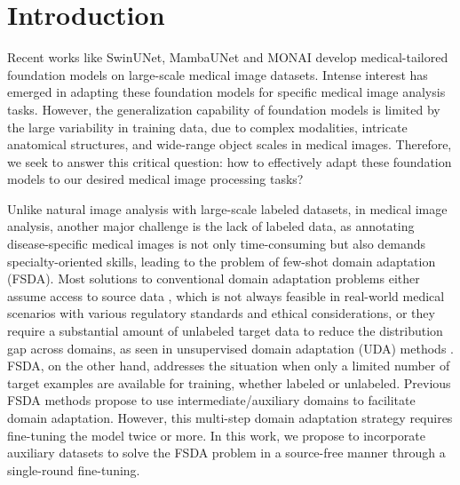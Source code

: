 \vspace{-0.1cm}
\section{Introduction}
\vspace{-0.1cm}
\label{sec:intro}
Recent works like SwinUNet\cite{cao2022swin}, MambaUNet \cite{wang2024mamba} and MONAI \cite{cardoso2022monai} develop medical-tailored foundation models on large-scale medical image datasets. 
Intense interest has emerged in adapting these foundation models for specific medical image analysis tasks. 
However, the generalization capability of foundation models is limited by the large variability in training data, due to complex modalities, intricate anatomical structures, and wide-range object scales in medical images.
Therefore, we seek to answer this critical question: how to effectively adapt these foundation models to our desired medical image processing tasks? 
% 

Unlike natural image analysis with large-scale labeled datasets, in medical image analysis, another major challenge is the lack of labeled data, as 
annotating disease-specific medical images is not only time-consuming but also demands %
specialty-oriented skills, leading to the problem of few-shot domain adaptation (FSDA). 
Most solutions to conventional domain adaptation problems either assume access to source data \cite{bermudez2018domain}, which is not always feasible in real-world medical scenarios with various regulatory standards and ethical considerations,
or they require a substantial amount of unlabeled target data to reduce the distribution gap across domains, as seen in unsupervised domain adaptation (UDA) methods  \cite{wu2021unsupervised}.
FSDA, on the other hand, addresses the situation when only a limited number of target examples are available for training, whether labeled or unlabeled.
Previous FSDA methods \cite{gu2019progressive} propose to use intermediate/auxiliary domains to facilitate domain adaptation.
However, this multi-step domain adaptation strategy requires fine-tuning the model twice or more.
In this work, we propose to incorporate auxiliary datasets to solve the FSDA problem in a source-free manner through a single-round fine-tuning.

